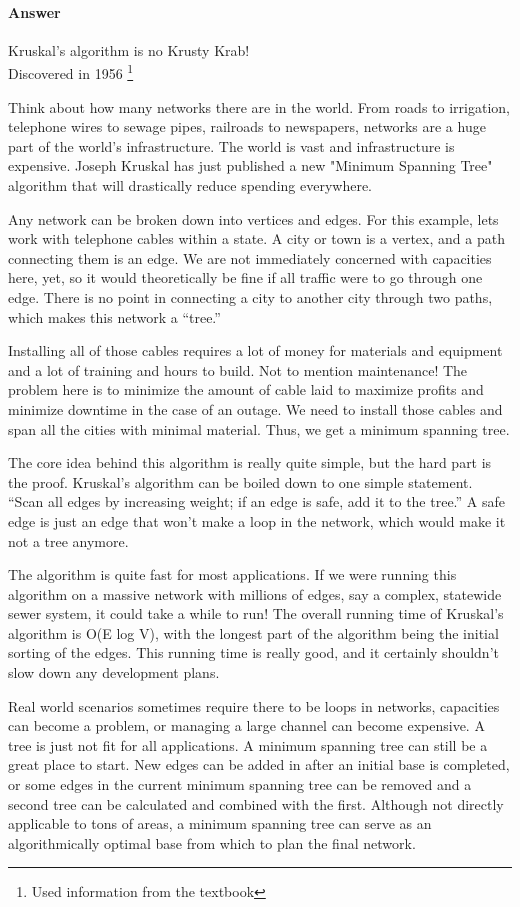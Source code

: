 \documentclass{article}
\begin{document}
\paragraph{Answer}

Kruskal's algorithm is no Krusty Krab!\\
Discovered in 1956 \footnote{Used information from the textbook}

Think about how many networks there are in the world. From roads to irrigation, telephone wires to sewage pipes, railroads to newspapers, networks are a huge part of the world's infrastructure. The world is vast and infrastructure is expensive. Joseph Kruskal has just published a new "Minimum Spanning Tree" algorithm that will drastically reduce spending everywhere.

Any network can be broken down into vertices and edges. For this example, lets work with telephone cables within a state. A city or town is a vertex, and a path connecting them is an edge. We are not immediately concerned with capacities here, yet, so it would theoretically be fine if all traffic were to go through one edge. There is no point in connecting a city to another city through two paths, which makes this network a “tree.”

Installing all of those cables requires a lot of money for materials and equipment and a lot of training and hours to build. Not to mention maintenance! The problem here is to minimize the amount of cable laid to maximize profits and minimize downtime in the case of an outage. We need to install those cables and span all the cities with minimal material. Thus, we get a minimum spanning tree.

The core idea behind this algorithm is really quite simple, but the hard part is the proof. Kruskal’s algorithm can be boiled down to one simple statement. “Scan all edges by increasing weight; if an edge is safe, add it to the tree.” A safe edge is just an edge that won’t make a loop in the network, which would make it not a tree anymore.

The algorithm is quite fast for most applications. If we were running this algorithm on a massive network with millions of edges, say a complex, statewide sewer system, it could take a while to run! The overall running time of Kruskal’s algorithm is O(E log V), with the longest part of the algorithm being the initial sorting of the edges. This running time is really good, and it certainly shouldn’t slow down any development plans.

Real world scenarios sometimes require there to be loops in networks, capacities can become a problem, or managing a large channel can become expensive. A tree is just not fit for all applications. A minimum spanning tree can still be a great place to start. New edges can be added in after an initial base is completed, or some edges in the current minimum spanning tree can be removed and a second tree can be calculated and combined with the first. Although not directly applicable to tons of areas, a minimum spanning tree can serve as an algorithmically optimal base from which to plan the final network.
\end{document}
